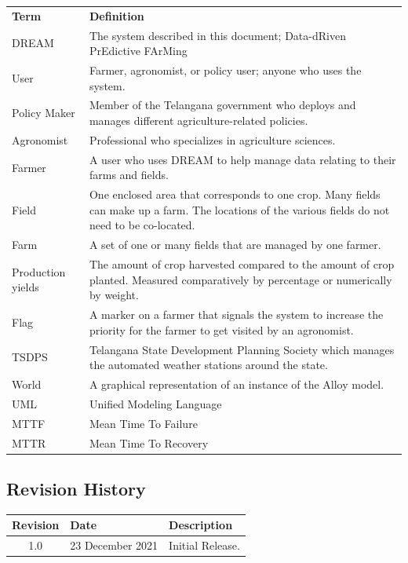 
\begin{center}
\renewcommand{\arraystretch}{1.25}
\begin{tabular}{l >{\raggedright\arraybackslash}p{12cm} } \hline
    \textbf{Term} & \textbf{Definition}\\ 
    DREAM & The system described in this document; Data-dRiven PrEdictive FArMing\\
    User & Farmer, agronomist, or policy user; anyone who uses the system.\\
	Policy Maker & Member of the Telangana government who deploys and manages different agriculture-related policies. \\
	Agronomist & Professional who specializes in agriculture sciences. \\
    Farmer & A user who uses DREAM to help manage data relating to their farms and fields.\\
    Field & One enclosed area that corresponds to one crop. Many fields can make up a farm. The locations of the various fields do not need to be co-located.\\
    Farm & A set of one or many fields that are managed by one farmer.\\
    Production yields & The amount of crop harvested compared to the amount of crop planted. Measured comparatively by percentage or numerically by weight.\\
    Flag & A marker on a farmer that signals the system to increase the priority for the farmer to get visited by an agronomist.\\
    TSDPS & Telangana State Development Planning Society which manages the automated weather stations around the state. \\
    World & A graphical representation of an instance of the Alloy model.\\
    UML & Unified Modeling Language\\
    MTTF & Mean Time To Failure\\
    MTTR & Mean Time To Recovery\\
    \hline
\end{tabular}
\end{center}

\subsection{Revision History}


\begin{flushleft}
\renewcommand{\arraystretch}{1.25}
\begin{tabular}{|c| l|>{\raggedright\arraybackslash}p{12cm} |} \hline
    \textbf{Revision} & \textbf{Date} & \textbf{Description}\\ \hline 
    1.0 & 23 December 2021 & Initial Release.\\
    \hline
\end{tabular}
\end{flushleft}


